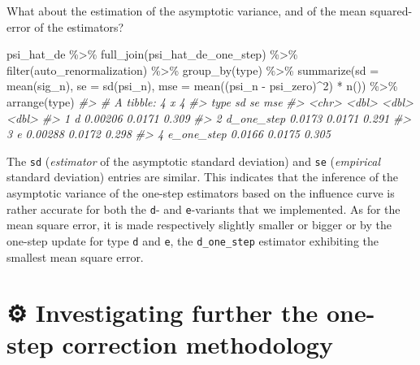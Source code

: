 \documentclass[
  11pt,
  openright,twoside]{book}
\newenvironment{Shaded}{\begin{snugshade}}{\end{snugshade}}
\newcommand{\AttributeTok}[1]{\textcolor[rgb]{0.77,0.63,0.00}{#1}}
\newcommand{\CommentTok}[1]{\textcolor[rgb]{0.56,0.35,0.01}{\textit{#1}}}
\newcommand{\DecValTok}[1]{\textcolor[rgb]{0.00,0.00,0.81}{#1}}
\newcommand{\FunctionTok}[1]{\textcolor[rgb]{0.00,0.00,0.00}{#1}}
\newcommand{\NormalTok}[1]{#1}
\newcommand{\SpecialCharTok}[1]{\textcolor[rgb]{0.00,0.00,0.00}{#1}}
\newcommand{\gear}{\usebox{\gearbox}\;}
\theoremstyle{definition}
\theoremstyle{definition}
\theoremstyle{definition}
\theoremstyle{definition}
\theoremstyle{remark}
\begin{document}
What about the estimation of the asymptotic variance, and of the mean squared-error of the estimators?

\begin{Shaded}
\begin{Highlighting}[]
\NormalTok{psi\_hat\_de }\SpecialCharTok{\%\textgreater{}\%}
  \FunctionTok{full\_join}\NormalTok{(psi\_hat\_de\_one\_step) }\SpecialCharTok{\%\textgreater{}\%}
  \FunctionTok{filter}\NormalTok{(auto\_renormalization) }\SpecialCharTok{\%\textgreater{}\%} 
  \FunctionTok{group\_by}\NormalTok{(type) }\SpecialCharTok{\%\textgreater{}\%}
  \FunctionTok{summarize}\NormalTok{(}\AttributeTok{sd =} \FunctionTok{mean}\NormalTok{(sig\_n),}
            \AttributeTok{se =} \FunctionTok{sd}\NormalTok{(psi\_n),}
            \AttributeTok{mse =} \FunctionTok{mean}\NormalTok{((psi\_n }\SpecialCharTok{{-}}\NormalTok{ psi\_zero)}\SpecialCharTok{\^{}}\DecValTok{2}\NormalTok{) }\SpecialCharTok{*} \FunctionTok{n}\NormalTok{()) }\SpecialCharTok{\%\textgreater{}\%}
  \FunctionTok{arrange}\NormalTok{(type)}
\CommentTok{\#\textgreater{} \# A tibble: 4 x 4}
\CommentTok{\#\textgreater{}   type            sd     se   mse}
\CommentTok{\#\textgreater{}   \textless{}chr\textgreater{}        \textless{}dbl\textgreater{}  \textless{}dbl\textgreater{} \textless{}dbl\textgreater{}}
\CommentTok{\#\textgreater{} 1 d          0.00206 0.0171 0.309}
\CommentTok{\#\textgreater{} 2 d\_one\_step 0.0173  0.0171 0.291}
\CommentTok{\#\textgreater{} 3 e          0.00288 0.0172 0.298}
\CommentTok{\#\textgreater{} 4 e\_one\_step 0.0166  0.0175 0.305}
\end{Highlighting}
\end{Shaded}

The \texttt{sd} (\emph{estimator} of the asymptotic standard deviation) and \texttt{se}
(\emph{empirical} standard deviation) entries are similar. This indicates that the
inference of the asymptotic variance of the one-step estimators based on the
influence curve is rather accurate for both the \texttt{d}- and \texttt{e}-variants that we
implemented. As for the mean square error, it is made respectively slightly
smaller or bigger or by the one-step update for type \texttt{d} and \texttt{e}, the
\texttt{d\_one\_step} estimator exhibiting the smallest mean square error.

\hypertarget{exo-one-step}{%
\section{\texorpdfstring{⚙ \gear Investigating further the one-step correction methodology}{⚙ Investigating further the one-step correction methodology}}\label{exo-one-step}}
\end{document}
